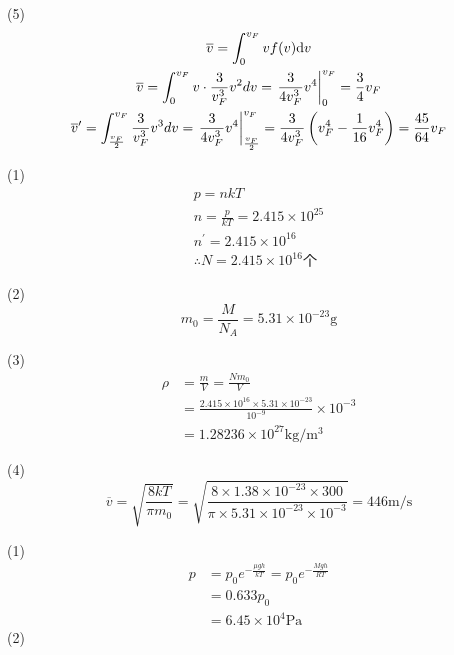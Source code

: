 (5)
\begin{gather*}
 {\overline{ v } = \int _ { 0 } ^ { v _F} v f ( v )\mathrm{d}v} \\
{\overline{ v } = \int _ { 0 } ^ { v _ { F } } v \cdot \frac { 3 } { v _ { F } ^ { 3 } } v ^ { 2 } d v = \left. \frac { 3 } { 4 v _ { F } ^ { 3 } } v ^ { 4 } \right| _ { 0 } ^ { v _ { F } } = \frac { 3 } { 4 } v _ { F } } \\
{\overline{ v } ^ { \prime } = \int _ { \frac { v _ { F } } { 2 } } ^ { v _ { F } } \frac { 3 } { v _ { F } ^ { 3 } } v ^ { 3 } d v = \left. \frac { 3 } { 4 v _ { F } ^ { 3 } } v ^ { 4 } \right| _ { \frac { v _ { F } } { 2 } } ^ { v _ { F } } = \frac { 3 } { 4 v _ { F } ^ { 3 } } \left( v _ { F } ^ { 4 } - \frac { 1 } { 16 } v _F^4\right) = \frac { 45 } { 64 } v _F}
\end{gather*}

\exercise

\solve
(1)
\begin{gather*}
{ p = n k T } \\ 
{ n = \frac { p } { k T } = 2.415 \times 10 ^ { 25 } } \\ 
{ n ^ { \prime } = 2.415 \times 10 ^ { 16 } } \\
 { \therefore N=2.415\times 10^{16}\mbox{个}} 
\end{gather*}

(2)
$$
m_0= \frac { M } {N_A} = 5.31 \times 10 ^{-23}\mathrm{g}
$$

(3)
\begin{align*}
\rho &= \frac {m} { V } = \frac {Nm_0}{V}\\
&= \frac { 2.415 \times 10 ^ { 16 } \times 5.31 \times 10 ^ { - 23 } } { 10 ^ { - 9 } } \times 10 ^ { - 3 } \\
&= 1.28236 \times 10^{27}\mathrm{kg/m^3}
\end{align*}

(4)
$$
\overline{ v } = \sqrt { \frac { 8 k T } { \pi m _ { 0 } } } = \sqrt { \frac { 8 \times 1.38 \times 10 ^ { - 23 } \times 300 } { \pi \times 5.31 \times 10 ^ { - 23 } \times 10 ^ { - 3 } } } = 446 \mathrm { m } / \mathrm {s}
$$

\exercise

\solve
(1)
\begin{align*}
p &= p _ { 0 } e ^ { - \frac { \mu g h } { k T } } = p _ { 0 } e ^ { - \frac { M g h } { R T } } \\
&= 0.633 p _ { 0 } \\
&= 6.45 \times 10 ^4\mathrm{Pa}
\end{align*}
(2)

